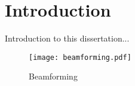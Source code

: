
\chapter{Introduction}
\label{cha:introduction}

Introduction to this dissertation...

\begin{figure}[!ht]
  \centering
  \texttt{[image: beamforming.pdf]}
  \caption{Beamforming}
\end{figure}

